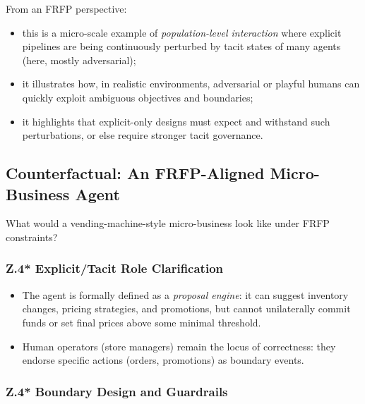 From an FRFP perspective:

\begin{itemize}
  \item this is a micro-scale example of \emph{population-level interaction}
        where explicit pipelines are being continuously perturbed by tacit
        states of many agents (here, mostly adversarial);
  \item it illustrates how, in realistic environments, adversarial or playful
        humans can quickly exploit ambiguous objectives and boundaries;
  \item it highlights that explicit-only designs must expect and withstand
        such perturbations, or else require stronger tacit governance.
\end{itemize}

\subsection{Counterfactual: An FRFP-Aligned Micro-Business Agent}

What would a vending-machine-style micro-business look like under FRFP
constraints?

\subsubsection*{Z.4* Explicit/Tacit Role Clarification}

\begin{itemize}
  \item The agent is formally defined as a \emph{proposal engine}:
        it can suggest inventory changes, pricing strategies, and promotions,
        but cannot unilaterally commit funds or set final prices above some
        minimal threshold.
  \item Human operators (store managers) remain the locus of correctness:
        they endorse specific actions (orders, promotions) as boundary events.
\end{itemize}

\subsubsection*{Z.4* Boundary Design and Guardrails}

